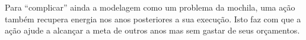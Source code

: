 \documentclass{article}
\begin{document}
Para ``complicar'' ainda a modelagem como um problema da mochila, uma ação
também recupera energia nos anos posteriores a sua execução.
Isto faz com que a ação ajude a alcançar a meta de outros anos mas sem gastar
de seus orçamentos.



\end{document}
